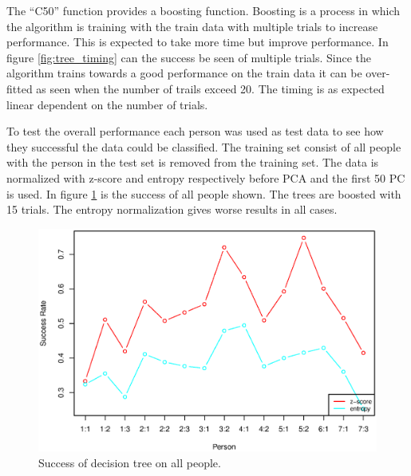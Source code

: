 The ``C50'' function provides a boosting function.
Boosting is a process in which the algorithm is training with the train data with multiple trials to increase performance.
This is expected to take more time but improve performance.
In figure \ref{fig:tree_timing} can the success be seen of multiple trials.
Since the algorithm trains towards a good performance on the train data it can be over-fitted as seen when the number of trails exceed 20. 
The timing is as expected linear dependent on the number of trials.

To test the overall performance each person was used as test data to see how they successful the data could be classified.
The training set consist of all people with the person in the test set is removed from the training set. 
The data is normalized with z-score and entropy respectively before PCA and the first 50 PC is used. 
In figure \ref{fig:tree_success_all} is the success of all people shown.
The trees are boosted with 15 trials.
The entropy normalization gives worse results in all cases.

\begin{figure}[h]
\includegraphics[width = \textwidth]{graphics/tree_success_all}
\caption{Success of decision tree on all people.}
\label{fig:tree_success_all}
\end{figure}
